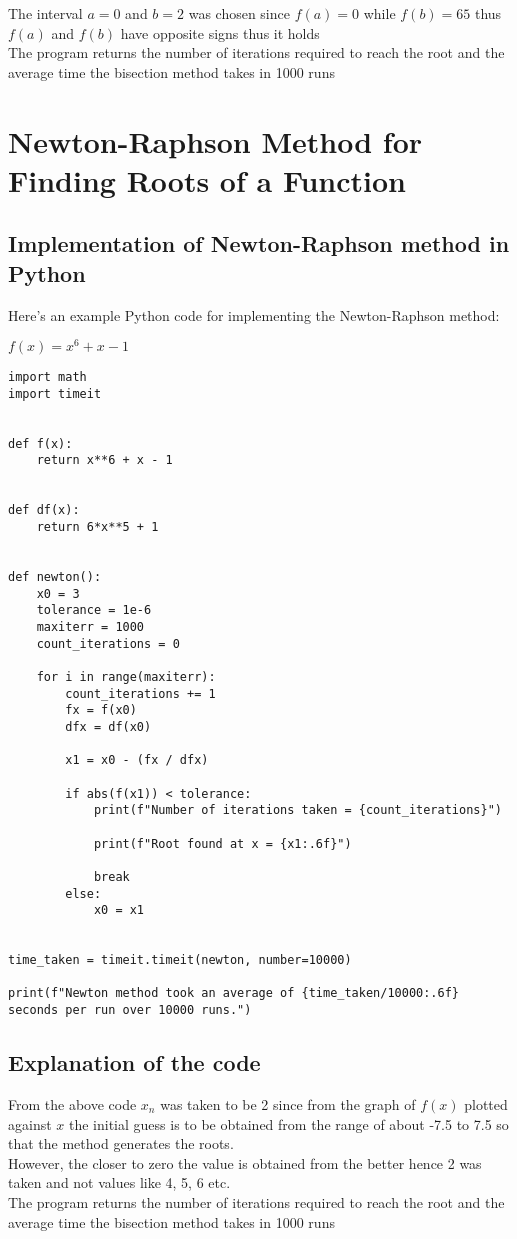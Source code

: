 \documentclass{article}
\begin{document}
The interval $ a = 0$ and $b = 2$ was chosen since $f(a) = 0$ while $f(b) = 65$ thus $f(a)$ and $f(b)$ have opposite signs thus it holds\\[10pt]
The program returns the number of iterations required to reach the root and the average time the bisection method takes in 1000 runs

\section{Newton-Raphson Method for Finding Roots of a Function}

\subsection{Implementation of Newton-Raphson method in Python}

Here's an example Python code for implementing the Newton-Raphson method:

$f(x) = x^6 + x - 1$

\begin{verbatim}
import math
import timeit


def f(x):
    return x**6 + x - 1


def df(x):
    return 6*x**5 + 1


def newton():
    x0 = 3
    tolerance = 1e-6
    maxiterr = 1000
    count_iterations = 0

    for i in range(maxiterr):
        count_iterations += 1
        fx = f(x0)
        dfx = df(x0)

        x1 = x0 - (fx / dfx)

        if abs(f(x1)) < tolerance:
            print(f"Number of iterations taken = {count_iterations}")

            print(f"Root found at x = {x1:.6f}")

            break
        else:
            x0 = x1


time_taken = timeit.timeit(newton, number=10000)

print(f"Newton method took an average of {time_taken/10000:.6f} seconds per run over 10000 runs.")

\end{verbatim}

\subsection{Explanation of the code}

From the above code $x_n$ was taken to be 2 since from the graph of $f(x)$ plotted against $x$ the initial guess is to be obtained from the range of about -7.5 to 7.5 so that the method generates the roots.\\[11pt]
However, the closer to zero the value is obtained from the better hence 2 was taken and not values like 4, 5, 6 etc.\\[11pt]
The program returns the number of iterations required to reach the root and the average time the bisection method takes in 1000 runs
\end{document}
